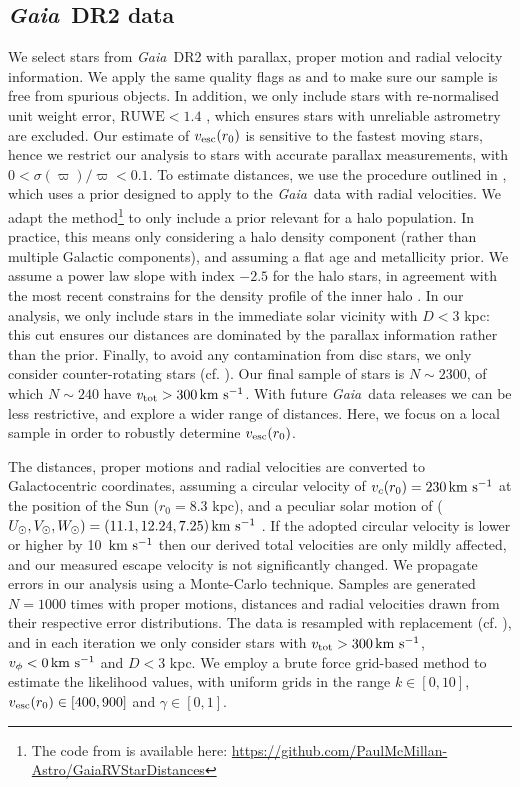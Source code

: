 \documentclass[fleqn,usenatbib]{mnras}
\newcommand{\kms}        {\,{\rm km}\,\,{\rm s}^{-1}}
\newcommand{\gaia}		{\emph{Gaia}}
\begin{document}
\subsection{\gaia\ DR2 data}
We select stars from \gaia\ DR2 with parallax, proper motion and radial velocity information. We apply the same quality flags as \cite{marchetti18} and \cite{monari18} to make sure our sample is free from spurious objects. In addition,  we only include stars with re-normalised unit weight error, $\mathrm{RUWE} < 1.4$ \citep{ruwe}, which ensures stars with unreliable astrometry are excluded. Our estimate of $v_{\rm esc}(r_0)$ is sensitive to the fastest moving stars, hence we restrict our analysis to stars with accurate parallax measurements, with $0 <\sigma(\varpi)/\varpi < 0.1$. To estimate distances, we use the procedure outlined in \cite{mcmillan18}, which uses a prior designed to apply to the \gaia\ data with radial velocities. We adapt the method\footnote{The code from \cite{mcmillan18} is available here: \url{https://github.com/PaulMcMillan-Astro/GaiaRVStarDistances}} to only include a prior relevant for a halo population. In practice, this means only considering a halo density component (rather than multiple Galactic components), and assuming a flat age and metallicity prior. We assume a power law slope with index $-2.5$ for the halo stars, in agreement with the most recent constrains for the density profile of the inner halo  \citep[e.g.][]{faccioli14, pila15}. In our analysis, we only include stars in the immediate solar vicinity with $D < 3$ kpc: this cut ensures our distances are dominated by the parallax information rather than the prior. Finally, to avoid any contamination from disc stars, we only consider counter-rotating stars (cf. \citealt{monari18}). Our final sample of stars is $N \sim 2300$, of which $N \sim 240$ have $v_{\rm tot} > 300 \kms$. With future \gaia\ data releases we can be less restrictive, and explore a wider range of distances. Here, we focus on a local sample in order to robustly determine $v_{\rm esc}(r_0)$.

The distances, proper motions and radial velocities are converted to Galactocentric coordinates, assuming a circular velocity of $v_c(r_0)= 230 \kms$ \citep{eilers18} at the position of the Sun ($r_0=8.3$ kpc), and a peculiar solar motion of ($U_\odot, V_\odot, W_\odot) = (11.1, 12.24, 7.25) \kms$ \citep{schonrich10}. If the adopted circular velocity is lower or higher by 10 $\kms$ then our derived total velocities are only mildly affected, and our measured escape velocity is not significantly changed. We propagate errors in our analysis using a Monte-Carlo technique. Samples are generated $N= 1000$ times with proper motions, distances and radial velocities drawn from their respective error distributions. The data is resampled with replacement (cf. \citealt{smith07}), and in each iteration we only consider stars with $v_{\rm tot} > 300 \kms$, $v_\phi < 0 \kms$ and $D < 3$ kpc. We employ a brute force grid-based method to estimate the likelihood values, with uniform grids in the range $k \in [0,10]$, $v_{\rm esc}(r_0) \in [400,900]$ and $\gamma \in [0,1]$. 
\end{document}
